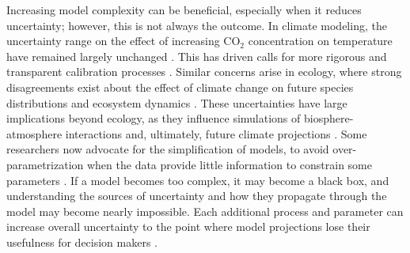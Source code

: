 \documentclass[11pt]{article}
\begin{document}
Increasing model complexity can be beneficial, especially when it reduces uncertainty; however, this is not always the outcome. In climate modeling, the uncertainty range on the effect of increasing CO$_{2}$ concentration on temperature have remained largely unchanged \citep{Zelinka2020}. This has driven calls for more rigorous and transparent calibration processes \citep{balaji2022general}. Similar concerns arise in ecology, where strong disagreements exist about the effect of climate change on future species distributions \citep{Cheaib2012} and ecosystem dynamics \citep{Lovenduski2017}.
These uncertainties have large implications beyond ecology, as they influence simulations of biosphere-atmosphere interactions and, ultimately, future climate projections \citep{Bonan2018, simpson2025confronting}.
Some researchers now advocate for the simplification of models, to avoid over-parametrization when the data provide little information to constrain some parameters \citep{Wang2017, Harrison2021}. %
If a model becomes too complex, it may become a black box, %
and understanding the sources of uncertainty and how they propagate through the model may become nearly impossible.
Each additional process and parameter can increase overall uncertainty to the point where model projections lose their usefulness for decision makers \citep{Saltelli2020}. %
\end{document}
